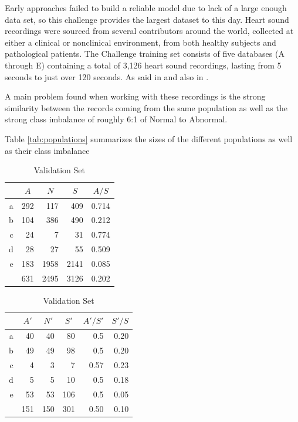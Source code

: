 \documentclass{project-logbook}
\begin{document}
{Early approaches failed to build a reliable model due to lack of a large enough data set, so this challenge provides the largest dataset to this day. Heart sound recordings were sourced from several contributors around the world, collected at either a clinical or nonclinical environment, from both healthy subjects and pathological patients. The Challenge training set consists of five databases (A through E) containing a total of 3,126 heart sound recordings, lasting from 5 seconds to just over 120 seconds. As said in \cite{einstein} and also in \cite{knuth-fa}.

A main problem found when working with these recordings is the strong similarity between the records coming from the same population  as well as the strong class imbalance of roughly 6:1 of Normal to Abnormal.

Table \ref{tab:populations} summarizes the sizes of the different populations as well as their class imbalance


\begin{table}[ht]
    \centering
    \begin{subtable}{0.48\textwidth}
        \centering
        \begin{tabular}{*{5}{r}}
            {}  & \multicolumn{1}{c}{$A$} & \multicolumn{1}{c}{$N$} & \multicolumn{1}{c}{$S$} & \multicolumn{1}{c}{$A/S$} \\
            \midrule
            a & 292 & 117   & 409   & 0.714 \\
            b & 104 & 386   & 490   & 0.212 \\
            c & 24  & 7     & 31    & 0.774 \\
            d & 28  & 27    & 55    & 0.509 \\
            e & 183 & 1958  & 2141  & 0.085 \\
            \midrule
            & 631 & 2495 & 3126 & 0.202 \\
        \end{tabular}
        \caption{Training Set}
    \end{subtable}
    \begin{subtable}{0.48\textwidth}
        \centering
        \begin{tabular}{*{6}{r}}
            {}  & \multicolumn{1}{c}{$A'$} & \multicolumn{1}{c}{$N'$} & \multicolumn{1}{c}{$S'$} & \multicolumn{1}{c}{$A'/S'$} & $S'/S$ \\
            \midrule
            a & 40  & 40    & 80    & 0.5   & 0.20 \\
            b & 49  & 49    & 98    & 0.5   & 0.20 \\
            c & 4   & 3     & 7     & 0.57  & 0.23 \\
            d & 5   & 5     & 10    & 0.5   & 0.18 \\
            e & 53  & 53    & 106   & 0.5   & 0.05 \\
            \midrule
            & 151 & 150 & 301 & 0.50 & 0.10 \\
        \end{tabular}
        \caption{Validation Set}
    \end{subtable}
    

\end{table}}
\end{document}
